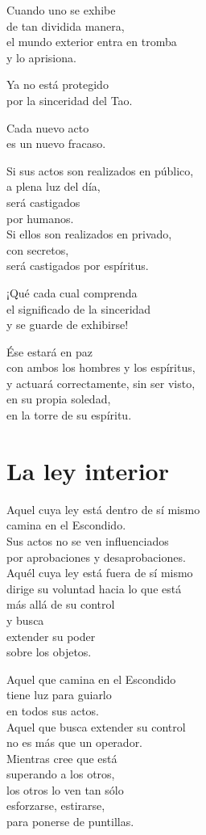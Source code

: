 \documentclass[book,b5paper,hidelinks,final]{memoir}
\begin{document}
	Cuando uno se exhibe\\
	de tan dividida manera,\\
	el mundo exterior entra en tromba\\
	y lo aprisiona.
	
	Ya no está protegido\\
	por la sinceridad del Tao.
	
	Cada nuevo acto\\
	es un nuevo fracaso.
	
	Si sus actos son realizados en público,\\
	a plena luz del día,\\
	será castigados\\
	por humanos.\\
	Si ellos son realizados en privado,\\
	con secretos,\\
	será castigados por espíritus.
	
	¡Qué cada cual comprenda\\
	el significado de la sinceridad\\
	y se guarde de exhibirse!
	
	Ése estará en paz\\
	con ambos los hombres y los espíritus,\\
	y actuará correctamente, sin ser visto,\\
	en su propia soledad,\\
	en la torre de su espíritu.
	
	\chapter*{La ley interior}
	
	Aquel cuya ley está dentro de sí mismo\\
	camina en el Escondido.\\
	Sus actos no se ven influenciados\\
	por aprobaciones y desaprobaciones.\\
	Aquél cuya ley está fuera de sí mismo\\
	dirige su voluntad hacia lo que está\\
	más allá de su control\\
	y busca\\
	extender su poder\\
	sobre los objetos.
	
	Aquel que camina en el Escondido\\
	tiene luz para guiarlo\\
	en todos sus actos.\\
	Aquel que busca extender su control\\
	no es más que un operador.\\
	Mientras cree que está\\
	superando a los otros,\\
	los otros lo ven tan sólo\\
	esforzarse, estirarse,\\
	para ponerse de puntillas.
	
\end{document}
